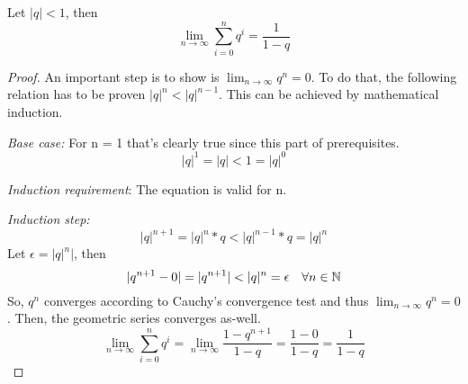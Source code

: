 \begin{lemma}
    Let $|q| < 1$, then
    \begin{equation}
        \lim_{n \to \infty}\sum_{i=0}^{n}q^i = \frac{1}{1-q}
    \end{equation}
\end{lemma}
\begin{proof}
    An important step is to show is $\lim_{n \to \infty}q^n = 0$.
    To do that, the following relation has to be proven $|q|^{n} < |q|^{n-1}$.
    This can be achieved by mathematical induction.

    \emph{Base case:} For n = 1 that's clearly true since this part of prerequisites.
    \begin{equation}
        |q|^1 = |q| < 1 = |q|^0
    \end{equation}

    \emph{Induction requirement}: The equation is valid for n.

    \emph{Induction step:} 
    \begin{equation}
        |q|^{n+1} = |q|^n * q < |q|^{n-1} * q = |q|^n 
    \end{equation}
    Let $\epsilon = |q|^n|$, then
    \begin{equation}
        |q^{n+1}-0| = |q^{n+1}| < |q|^n = \epsilon \quad \forall n \in \mathbb{N}
    \end{equation}
    So, $q^n$ converges according to Cauchy's convergence test and 
    thus $\lim_{n \to \infty}q^n = 0$.
    Then, the geometric series converges as-well.
    \begin{equation}
        \lim_{n \to \infty}\sum_{i=0}^{n}q^i = \lim_{n \to \infty}\frac{1-q^{n+1}}{1-q}
                                             = \frac{1-0}{1-q}
                                             = \frac{1}{1-q}
    \end{equation}
\end{proof}

